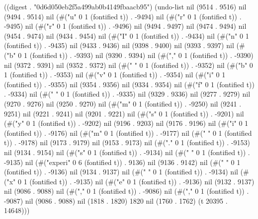 
((digest . "0d6d050eb2f5a499ab0b4149fbaacb95") (undo-list nil (9514 . 9516) nil (9494 . 9514) nil (#("u" 0 1 (fontified t)) . -9494) nil (#("r" 0 1 (fontified t)) . -9495) nil (#("r" 0 1 (fontified t)) . -9496) nil (9494 . 9497) nil (9474 . 9494) nil (9454 . 9474) nil (9434 . 9454) nil (#("I" 0 1 (fontified t)) . -9434) nil (#("n" 0 1 (fontified t)) . -9435) nil (9433 . 9436) nil (9398 . 9400) nil (9393 . 9397) nil (#("b" 0 1 (fontified t)) . -9393) nil (9390 . 9394) nil (#("," 0 1 (fontified t)) . -9390) nil (9372 . 9391) nil (9352 . 9372) nil (#(" " 0 1 (fontified t)) . -9352) nil (#("b" 0 1 (fontified t)) . -9353) nil (#("v" 0 1 (fontified t)) . -9354) nil (#("i" 0 1 (fontified t)) . -9355) nil (9354 . 9356) nil (9334 . 9354) nil (#("f" 0 1 (fontified t)) . -9334) nil (#(" " 0 1 (fontified t)) . -9335) nil (9329 . 9336) nil (9277 . 9279) nil (9270 . 9276) nil (9250 . 9270) nil (#("m" 0 1 (fontified t)) . -9250) nil (9241 . 9251) nil (9221 . 9241) nil (9201 . 9221) nil (#("s" 0 1 (fontified t)) . -9201) nil (#("y" 0 1 (fontified t)) . -9202) nil (9196 . 9203) nil (9176 . 9196) nil (#("i" 0 1 (fontified t)) . -9176) nil (#("m" 0 1 (fontified t)) . -9177) nil (#(" " 0 1 (fontified t)) . -9178) nil (9173 . 9179) nil (9153 . 9173) nil (#("." 0 1 (fontified t)) . -9153) nil (9134 . 9154) nil (#("s" 0 1 (fontified t)) . -9134) nil (#(" " 0 1 (fontified t)) . -9135) nil (#("experi" 0 6 (fontified t)) . 9136) nil (9136 . 9142) nil (#(" " 0 1 (fontified t)) . -9136) nil (9134 . 9137) nil (#(" " 0 1 (fontified t)) . -9134) nil (#("x" 0 1 (fontified t)) . -9135) nil (#("e" 0 1 (fontified t)) . -9136) nil (9132 . 9137) nil (9086 . 9088) nil (#("," 0 1 (fontified t)) . -9086) nil (#("," 0 1 (fontified t)) . -9087) nil (9086 . 9088) nil (1818 . 1820) 1820 nil (1760 . 1762) (t 20395 . 14648)))
